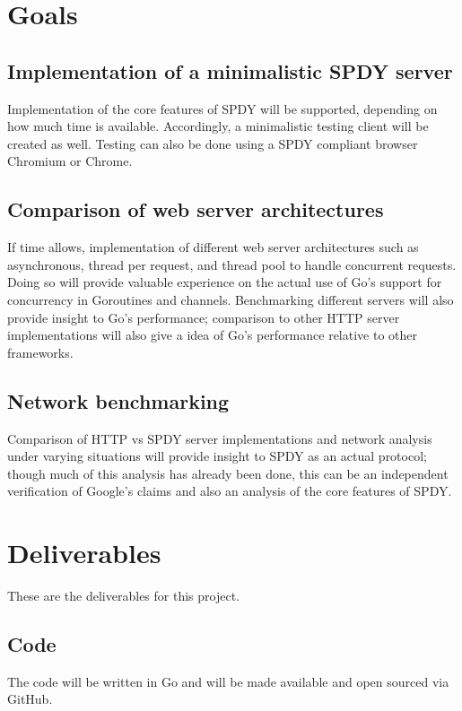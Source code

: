 \documentclass{article}
\begin{document}
\section{Goals}
\label{goals}

\subsection{Implementation of a minimalistic SPDY server}
Implementation of the core features of SPDY will be supported, depending on how much time is available. Accordingly, a minimalistic testing client will be created as well. Testing
can also be done using a SPDY compliant browser Chromium or Chrome.

\subsection{Comparison of web server architectures}
If time allows, implementation of different web server architectures such as asynchronous, thread per request, and thread pool to handle concurrent requests. Doing so will provide
valuable experience on the actual use of Go's support for concurrency in Goroutines and channels. Benchmarking different servers will also provide insight to Go's performance;
comparison to other HTTP server implementations will also give a idea of Go's performance relative to other frameworks.

\subsection{Network benchmarking}
Comparison of HTTP vs SPDY server implementations and network analysis under varying situations will provide insight to SPDY as an actual protocol; though much of this analysis has
already been done, this can be an independent verification of Google's claims and also an analysis of the core features of SPDY. 

\section{Deliverables}
\label{deliverables}
These are the deliverables for this project.

\subsection{Code}

\label{labelStatement}
The code will be written in Go and will be made available and
open sourced via GitHub.
\end{document}
